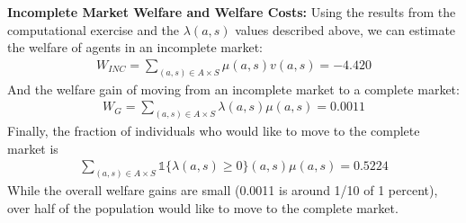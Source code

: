 \documentclass[12pt]{article}
\newcommand{\one}{\mathds{1}}
\begin{document}
\clearpage
\noindent\textbf{Incomplete Market Welfare and Welfare Costs: } Using the results from the computational exercise and the $\lambda(a,s)$ values described above, we can estimate the welfare of agents in an incomplete market:
\begin{align*}
    W_{INC} = \sum_{(a,s)\in A \times S} \mu(a, s) v(a, s) = -4.420 
\end{align*}
And the welfare gain of moving from an incomplete market to a complete market:
\begin{align*}
    W_{G} = \sum_{(a,s)\in A \times S} \lambda(a, s) \mu(a, s) = 0.0011
\end{align*}
Finally, the fraction of individuals who would like to move to the complete market is 
\begin{align*}
    \sum_{(a,s)\in A \times S} \one\{\lambda(a, s) \ge 0 \}(a, s) \mu(a, s) = 0.5224
\end{align*}
While the overall welfare gains are small (0.0011 is around 1/10 of 1 percent), over half of the population would like to move to the complete market. 
\end{document}
